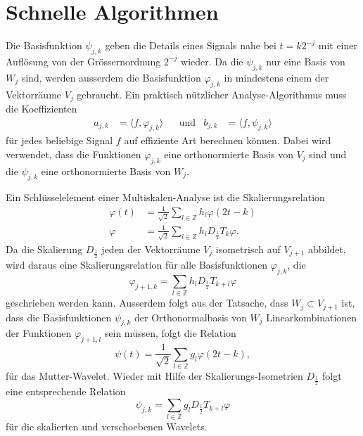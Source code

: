 %
%
%
\section{Schnelle Algorithmen
\label{section:fast}}
Die Basisfunktion $\psi_{j,k}$ geben die Details eines Signals nahe bei $t=k2^{-j}$ 
mit einer Auflösung von der Grössernordnung $2^{-j}$ wieder.
Da die $\psi_{j,k}$ nur eine Basis von $W_j$ sind, werden ausserdem die
Basisfunktion $\varphi_{j,k}$ in mindestens einem der Vektorräume
$V_j$ gebraucht.
Ein praktisch nützlicher Analyse-Algorithmus muss die Koeffizienten
\[
\begin{aligned}
a_{j,k} &= \langle f, \varphi_{j,k}\rangle
&&\text{und}&
b_{j,k} &= \langle f, \psi_{j,k}\rangle
\end{aligned}
\]
für jedes beliebige Signal $f$ auf effiziente Art berechnen können.
Dabei wird verwendet, dass die Funktionen  $\varphi_{j,k}$ eine
orthonormierte Basis von $V_j$ sind und die $\psi_{j,k}$ eine
orthonormierte Basis von $W_j$.

Ein Schlüsselelement einer Multiskalen-Analyse ist die Skalierungsrelation
\begin{align*}
\varphi(t) &= \frac{1}{\sqrt{2}} \sum_{l\in\mathbb Z} h_l \varphi(2t-k)
\\
\varphi    &= \frac{1}{\sqrt{2}} \sum_{l\in\mathbb Z} h_l D_{\frac12}T_k\varphi.
\end{align*}
Da die Skalierung $D_{\frac12}$ jeden der Vektorräume $V_j$ isometrisch auf $V_{j+1}$
abbildet, wird daraus eine Skalierungsrelation für alle Basisfunktionen $\varphi_{j,k}$,
die
\begin{equation}
\varphi_{j+1,k}
=
\sum_{l\in\mathbb Z} h_l D_{\frac12}T_{k+l}\varphi
\label{fast:phirelation}
\end{equation}
geschrieben werden kann.
Ausserdem folgt aus der Tatsache, dass $W_j\subset V_{j+1}$ ist, dass die Basisfunktionen
$\psi_{j,k}$ der Orthonormalbasis von $W_j$ Linearkombinationen der Funktionen
$\varphi_{j+1,l}$ sein müssen, folgt die Relation
\[
\psi(t) = \frac{1}{\sqrt{2}}\sum_{l\in\mathbb Z} g_l \varphi(2t-k),
\]
für das Mutter-Wavelet.
Wieder mit Hilfe der Skalierungs-Isometrien $D_{\frac12}$ folgt eine entsprechende
Relation
\begin{equation}
\psi_{j,k}
=
\sum_{l\in\mathbb Z} g_l D_{\frac12}T_{k+l}\varphi
\label{fast:psirelation}
\end{equation}
für die skalierten und verschoebenen Wavelets.

